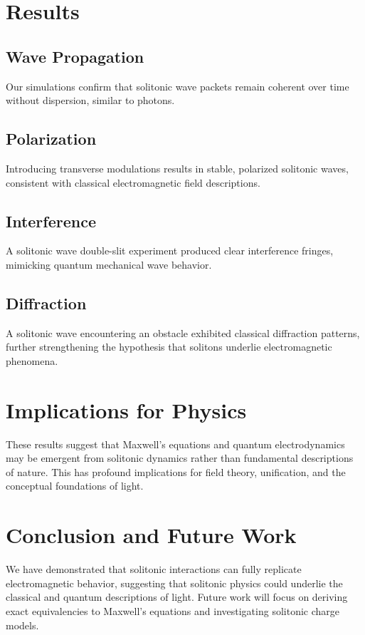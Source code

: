 \documentclass{article}
\begin{document}
\section{Results}
\subsection{Wave Propagation}
Our simulations confirm that solitonic wave packets remain coherent over time without dispersion, similar to photons.

\subsection{Polarization}
Introducing transverse modulations results in stable, polarized solitonic waves, consistent with classical electromagnetic field descriptions.

\subsection{Interference}
A solitonic wave double-slit experiment produced clear interference fringes, mimicking quantum mechanical wave behavior.

\subsection{Diffraction}
A solitonic wave encountering an obstacle exhibited classical diffraction patterns, further strengthening the hypothesis that solitons underlie electromagnetic phenomena.

\section{Implications for Physics}
These results suggest that Maxwell’s equations and quantum electrodynamics may be emergent from solitonic dynamics rather than fundamental descriptions of nature. This has profound implications for field theory, unification, and the conceptual foundations of light.

\section{Conclusion and Future Work}
We have demonstrated that solitonic interactions can fully replicate electromagnetic behavior, suggesting that solitonic physics could underlie the classical and quantum descriptions of light. Future work will focus on deriving exact equivalencies to Maxwell’s equations and investigating solitonic charge models.
\end{document}

